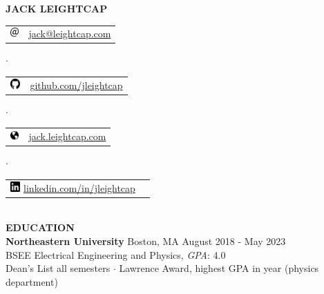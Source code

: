 \documentclass[10pt,a4paper]{article} %
\begin{document}
		
	\begin{center}
	\textbf{\huge{JACK LEIGHTCAP}}\\[12pt]
	\begin{tabular}{cc}
		\includegraphics[align=c,height=0.15in]{mention.png} & \href{mailto:jack@leightcap.com}{jack@leightcap.com}\\
	\end{tabular}
	\hspace{1mm} $\cdot$ \hspace{1mm}
	\begin{tabular}{cc}
		\includegraphics[align=c,height=0.15in]{mark-github.png} & \href{http://github.com/jleightcap}{github.com/jleightcap}\\
	\end{tabular}
	\hspace{1mm} $\cdot$ \hspace{1mm}
	\begin{tabular}{cc}
		\includegraphics[align=c,height=0.15in]{globe.png} & \href{jack.leightcap.com}{jack.leightcap.com}\\
	\end{tabular}
	\hspace{1mm} $\cdot$ \hspace{1mm}
	\begin{tabular}{cc}
		\includegraphics[align=c,height=0.15in]{linkedin.png} \href{http://www.linkedin.com/in/jleightcap}{linkedin.com/in/jleightcap}\\
	\end{tabular}
	
	
	\end{center}
	\hrulefill\\[12pt]
	\textbf{\LARGE{EDUCATION}}\\[6pt]
		\textbf{\Large{Northeastern University}} Boston, MA \hfill August 2018 - May 2023\\
		BSEE Electrical Engineering and Physics, \textit{GPA}: 4.0\\
		Dean's List all semesters $\cdot$ Lawrence Award, highest GPA in year (physics department)\\
\end{document}
